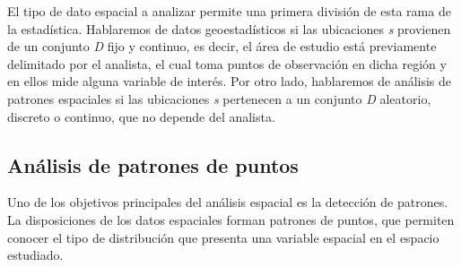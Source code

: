 El tipo de dato espacial a analizar permite una primera división de esta rama de la estadística.
Hablaremos de datos geoestadísticos si las ubicaciones \textit{s} provienen de un conjunto \textit{D} fijo y continuo, es decir, el área de estudio
está previamente delimitado por el analista, el cual toma puntos de observación en dicha región y en ellos mide alguna variable de interés.
Por otro lado, hablaremos de análisis de patrones espaciales si las ubicaciones \textit{s} pertenecen a un conjunto \textit{D} aleatorio, discreto o continuo, 
que no depende del analista.

\subsection{Análisis de patrones de puntos}
Uno de los objetivos principales del análisis espacial es la detección de patrones.
La disposiciones de los datos espaciales forman patrones de puntos, que permiten conocer el tipo de distribución que presenta una variable espacial en el espacio estudiado.

